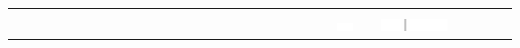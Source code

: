 \documentclass[10pt]{article}
\begin{document}
\begin{center}
\begin{tabular}{|c|c|c|c|c|c|c|c|c|c|c|c|c|c|c|c|c|c|c|c|c|c|c|c|c|c|c|c|c|c|}
 &  &  &  &  \\
\hline
 &  &  &  &  &  &  &  &  &  &  &  &  &  &  &  &  &  &  &  &  &  &  &  &  &  &  &  &  &  \\
\hline
 &  &  &  &  &  &  &  &  &  &  &  &  &  &  &  &  &  &  &  &  &  &  & \includegraphics[max width=\textwidth]{2024_11_21_6438f6dbc3784fe6d1deg-08(5)}
 &  & \includegraphics[max width=\textwidth]{2024_11_21_6438f6dbc3784fe6d1deg-08(3)}
 &  &  &  &  \\
\hline

\end{tabular}
\end{center}
\end{document}
